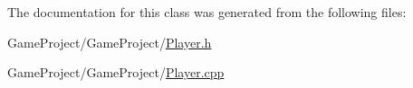 The documentation for this class was generated from the following files\-:\begin{DoxyCompactItemize}
\item 
Game\-Project/\-Game\-Project/\hyperlink{_player_8h}{Player.\-h}\item 
Game\-Project/\-Game\-Project/\hyperlink{_player_8cpp}{Player.\-cpp}\end{DoxyCompactItemize}
